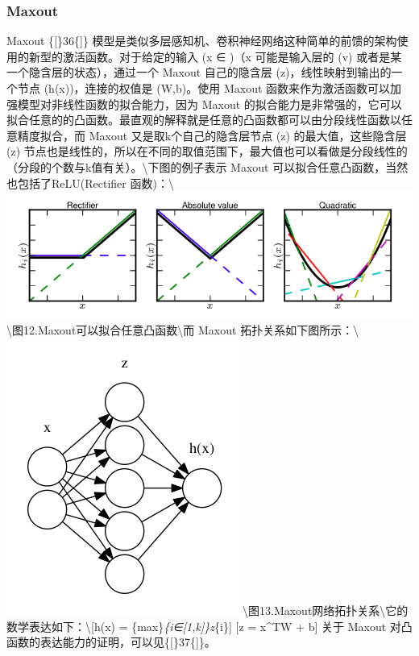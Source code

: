 \subsubsection{Maxout}\label{maxout}

Maxout \{{[}\}36\{{]}\}
模型是类似多层感知机、卷积神经网络这种简单的前馈的架构使用的新型的激活函数。对于给定的输入
(x ∈ \Re)（x 可能是输入层的 (v) 或者是某一个隐含层的状态），通过一个
Maxout 自己的隐含层 (z)，线性映射到输出的一个节点 (h(x))，连接的权值是
(W,b)。使用 Maxout
函数来作为激活函数可以加强模型对非线性函数的拟合能力，因为 Maxout
的拟合能力是非常强的，它可以拟合任意的的凸函数。最直观的解释就是任意的凸函数都可以由分段线性函数以任意精度拟合，而
Maxout 又是取k个自己的隐含层节点 (z) 的最大值，这些隐含层 (z)
节点也是线性的，所以在不同的取值范围下，最大值也可以看做是分段线性的（分段的个数与k值有关）。\textbackslash{}下图的例子表示
Maxout 可以拟合任意凸函数，当然也包括了ReLU(Rectifier
函数)：\textbackslash{}\includegraphics{picture/maxout.png}\textbackslash{}图12.Maxout可以拟合任意凸函数\textbackslash{}而
Maxout
拓扑关系如下图所示：\textbackslash{}\includegraphics{picture/maxout-implement.png}\textbackslash{}图13.Maxout网络拓扑关系\textbackslash{}它的数学表达如下：\textbackslash{}{[}h(x)
= \{max\}\limits\emph{\{i∈{[}1,k{]}\}z}\{i\}{]} {[}z = x\^{}TW + b{]}
关于 Maxout 对凸函数的表达能力的证明，可以见\{{[}\}37\{{]}\}。

